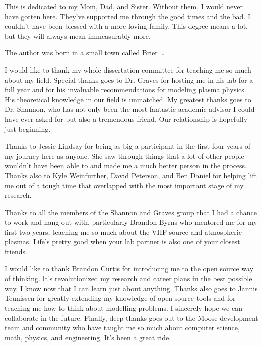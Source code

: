 \makecopyrightpage

\maketitlepage

\begin{dedication}
This is dedicated to my Mom, Dad, and Sister. Without them, I would never have gotten here. They've supported me through the good times and the bad. I couldn't have been blessed with a more loving family. This degree means a lot, but they will always mean immeasurably more.
\end{dedication}

\begin{biography}
The author was born in a small town called Brier \ldots
\end{biography}

\begin{acknowledgements}
I would like to thank my whole dissertation committee for teaching me so much about my field. Special thanks goes to Dr. Graves for hosting me in his lab for a full year and for his invaluable recommendations for modeling plasma physics. His theoretical knowledge in our field is unmatched. My greatest thanks goes to Dr. Shannon, who has not only been the most fantastic academic advisor I could have ever asked for but also a tremendous friend. Our relationship is hopefully just beginning.

Thanks to Jessie Lindsay for being as big a participant in the first four years of my journey here as anyone. She saw through things that a lot of other people wouldn't have been able to and made me a much better person in the process. Thanks also to Kyle Weinfurther, David Peterson, and Ben Daniel for helping lift me out of a tough time that overlapped with the most important stage of my research.

Thanks to all the members of the Shannon and Graves group that I had a chance to work and hang out with, particularly Brandon Byrns who mentored me for my first two years, teaching me so much about the VHF source and atmospheric plasmas. Life's pretty good when your lab partner is also one of your closest friends.

I would like to thank Brandon Curtis for introducing me to the open source way of thinking. It's revolutionized my research and career plans in the best possible way. I know now that I can learn just about anything. Thanks also goes to Jannis Teunissen for greatly extending my knowledge of open source tools and for teaching me how to think about modelling problems. I sincerely hope we can collaborate in the future. Finally, deep thanks goes out to the Moose development team and community who have taught me so much about computer science, math, physics, and engineering. It's been a great ride.
\end{acknowledgements}


\thesistableofcontents

\thesislistoftables

\thesislistoffigures
